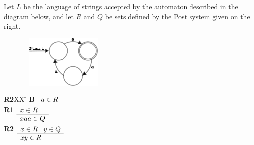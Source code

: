 \documentclass[addpoints]{exam}
\begin{document}
\begin{questions}
\clearpage
\question Let $L$ be the language of strings accepted by the automaton
described in the diagram below, and let $R$ and $Q$ be sets defined by
the Post system given on the right.

\begin{multicols}{2}
\begin{center}
\includegraphics[width=2.5in, height=1in,keepaspectratio=true]{1mod3automaton.pdf}

\end{center}

\begin{tabbing}
{\bf R2}XX \=  \kill
{\bf B} \>
        \(\begin{array}[t]{l}
        a \in R
        \end{array}\) \\[2ex]
{\bf R1} \>
        \(\begin{array}[t]{l}
        x\in R  \\
        \hline
        xaa \in Q
        \end{array}\) \\[2ex]
{\bf R2} \>
        \(\begin{array}[t]{l}
        x\in R\;\;\;y\in Q \\
        \hline
        xy \in R
        \end{array}\) 
\end{tabbing}
\end{multicols}

\end{questions}
\end{document}
